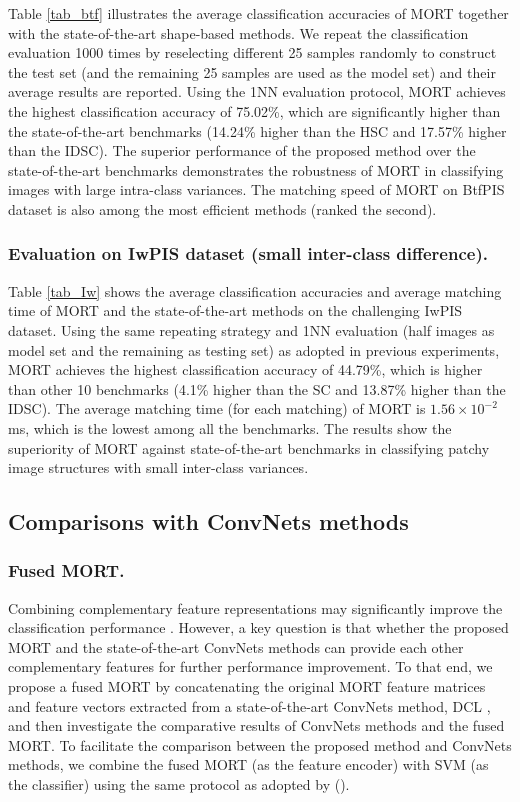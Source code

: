 \documentclass[letterpaper]{article} %
\begin{document}
Table \ref{tab_btf} illustrates the average classification accuracies of MORT together with the state-of-the-art shape-based methods. We repeat the classification evaluation 1000 times by reselecting different 25 samples randomly to construct the test set (and the remaining 25 samples are used as the model set) and their average results are reported. Using the 1NN evaluation protocol, MORT achieves the highest classification accuracy of 75.02\%, which are significantly higher than the state-of-the-art benchmarks (14.24\% higher than the HSC and 17.57\% higher than the IDSC). The superior performance of the proposed method over the state-of-the-art benchmarks demonstrates the robustness of MORT in classifying images with large intra-class variances. The matching speed of MORT on BtfPIS dataset is also among the most efficient methods (ranked the second).


\subsubsection{Evaluation on IwPIS dataset (small inter-class difference).}

Table \ref{tab_Iw} shows the average classification accuracies and average matching time of MORT and the state-of-the-art methods on the challenging IwPIS dataset. Using the same repeating strategy and 1NN evaluation (half images as model set and the remaining as testing set) as adopted in previous experiments, MORT achieves the highest classification accuracy of 44.79\%, which is higher than other 10 benchmarks (4.1\% higher than the SC and 13.87\% higher than the IDSC). The average matching time (for each matching) of MORT is $ 1.56 \times 10^{-2}$ ms, which is the lowest among all the benchmarks. The results show the superiority of MORT against state-of-the-art benchmarks in classifying patchy image structures with small inter-class variances.




\subsection{Comparisons with ConvNets methods}
\subsubsection{Fused MORT.}
Combining complementary feature representations may significantly improve the classification performance \cite{wang2015beyond}. However, a key question is that whether the proposed MORT and the state-of-the-art ConvNets methods can provide each other complementary features for further performance improvement. To that end, we propose a fused MORT by concatenating the original MORT feature matrices and feature vectors extracted from a state-of-the-art ConvNets method, DCL \cite{chen2019destruction}, and then investigate the comparative results of ConvNets methods and the fused MORT. To facilitate the comparison between the proposed method and ConvNets methods, we combine the fused MORT (as the feature encoder) with SVM (as the classifier) using the same protocol as adopted by \citeauthor{wu2019ip102} (\citeyear{wu2019ip102}).
\end{document}
